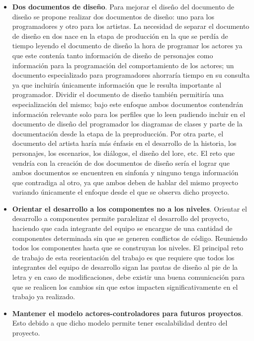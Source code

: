 \begin{itemize}
    \item \textbf{Dos documentos de diseño}. Para mejorar el diseño del documento
    de diseño se propone realizar dos documentos de diseño: uno para los programadores
    y otro para los artistas. La necesidad de separar el documento de diseño en dos
    nace en la etapa de producción en la que se perdía de tiempo leyendo el documento
    de diseño la hora de programar los actores ya que este contenía tanto información
    de diseño de personajes como información para la programación del comportamiento
    de los actores; un documento especializado para programadores ahorraría tiempo
    en su consulta ya que incluiría únicamente información que le resulta importante
    al programador. Dividir el documento de diseño también permitiría una
    especialización del mismo; bajo este enfoque ambos documentos contendrán
    información relevante solo para los perfiles que lo leen pudiendo incluir en
    el documento de diseño del programador los diagramas de clases y parte de la
    documentación desde la etapa de la preproducción. Por otra parte, el documento
    del artista haría más énfasis en el desarrollo de la historia, los personajes,
    los escenarios, los diálogos, el diseño del lore, etc. El reto que vendría con
    la creación de dos documentos de diseño sería el lograr que ambos documentos
    se encuentren en sinfonía y ninguno tenga información que contradiga al otro,
    ya que ambos deben de hablar del mismo proyecto variando únicamente el enfoque
    desde el que se observa dicho proyecto.

    \item \textbf{Orientar el desarrollo a los componentes no a los niveles}.
    Orientar el desarrollo a componentes permite paralelizar el desarrollo del
    proyecto, haciendo que cada integrante del equipo se encargue de una cantidad
    de componentes determinada sin que se generen conflictos de código. Reuniendo
    todos los componentes hasta que se construyan los niveles. El principal reto
    de trabajo de esta reorientación del trabajo es que requiere que todos los
    integrantes del equipo de desarrollo sigan las pautas de diseño al pie de la
    letra y en caso de modificaciones, debe existir una buena comunicación para que
    se realicen los cambios sin que estos impacten significativamente en el trabajo
    ya realizado.

    \item\textbf{Mantener el modelo actores-controladores para futuros proyectos}.
    Esto debido a que dicho modelo permite tener escalabilidad dentro del proyecto.
\end{itemize}
